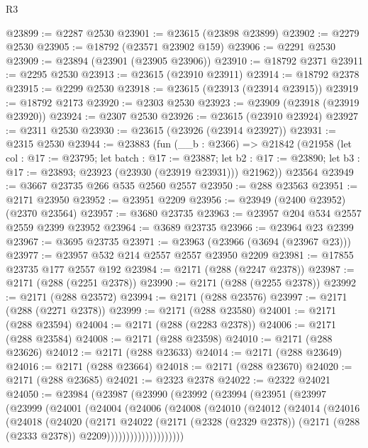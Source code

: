 \begin{lexlean}{R3}
\begin{coremodule}
@23899 := @2287 @2530
@23901 := @23615 (@23898 @23899)
@23902 := @2279 @2530
@23905 := @18792 (@23571 @23902 @159)
@23906 := @2291 @2530
@23909 := @23894 (@23901 (@23905 @23906))
@23910 := @18792 @2371
@23911 := @2295 @2530
@23913 := @23615 (@23910 @23911)
@23914 := @18792 @2378
@23915 := @2299 @2530
@23918 := @23615 (@23913 (@23914 @23915))
@23919 := @18792 @2173
@23920 := @2303 @2530
@23923 := @23909 (@23918 (@23919 @23920))
@23924 := @2307 @2530
@23926 := @23615 (@23910 @23924)
@23927 := @2311 @2530
@23930 := @23615 (@23926 (@23914 @23927))
@23931 := @2315 @2530
@23944 := @23883
    (fun (__b : @2366) =>
    @21842
      (@21958
        (let col : @17 := @23795;
        let batch : @17 := @23887;
        let b2 : @17 := @23890; let b3 : @17 := @23893; @23923 (@23930 (@23919 @23931)))
        @21962))
    @23564
@23949 := @3667 @23735 @266 @535 @2560 @2557
@23950 := @288 @23563
@23951 := @2171 @23950
@23952 := @23951 @2209
@23956 := @23949 (@2400 @23952) (@2370 @23564)
@23957 := @3680 @23735
@23963 := @23957 @204 @534 @2557 @2559 @2399 @23952
@23964 := @3689 @23735
@23966 := @23964 @23 @2399
@23967 := @3695 @23735
@23971 := @23963 (@23966 (@3694 (@23967 @23)))
@23977 := @23957 @532 @214 @2557 @2557 @23950 @2209
@23981 := @17855 @23735 @177 @2557 @192
@23984 := @2171 (@288 (@2247 @2378))
@23987 := @2171 (@288 (@2251 @2378))
@23990 := @2171 (@288 (@2255 @2378))
@23992 := @2171 (@288 @23572)
@23994 := @2171 (@288 @23576)
@23997 := @2171 (@288 (@2271 @2378))
@23999 := @2171 (@288 @23580)
@24001 := @2171 (@288 @23594)
@24004 := @2171 (@288 (@2283 @2378))
@24006 := @2171 (@288 @23584)
@24008 := @2171 (@288 @23598)
@24010 := @2171 (@288 @23626)
@24012 := @2171 (@288 @23633)
@24014 := @2171 (@288 @23649)
@24016 := @2171 (@288 @23664)
@24018 := @2171 (@288 @23670)
@24020 := @2171 (@288 @23685)
@24021 := @2323 @2378
@24022 := @2322 @24021
@24050 := @23984
    (@23987
      (@23990
        (@23992
          (@23994
            (@23951
              (@23997
                (@23999
                  (@24001
                    (@24004
                      (@24006
                        (@24008
                          (@24010
                            (@24012
                              (@24014
                                (@24016
                                  (@24018
                                    (@24020
                                      (@2171
                                        @24022
                                        (@2171
                                          (@2328 (@2329 @2378))
                                          (@2171 (@288 (@2333 @2378)) @2209))))))))))))))))))))

\end{coremodule}
\end{lexlean}
